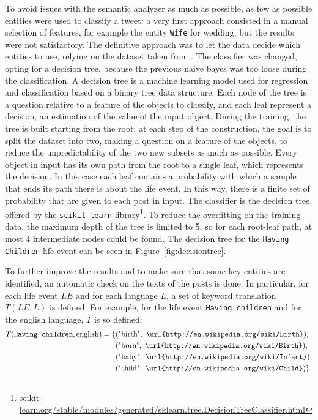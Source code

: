 To avoid issues with the semantic analyzer as much as possible, as few as possible entities were used to classify a tweet: a very first approach consisted in a manual selection of features, for example the entity \texttt{Wife} for wedding, but the results were not satisfactory. The definitive approach was to let the data decide which entities to use, relying on the dataset taken from \cite{dickinson2015identifying}. The classifier was changed, opting for a decision tree, because the previous naive bayes was too loose during the classification. A decision tree is a machine learning model used for regression and classification based on a binary tree data structure. Each node of the tree is a question relative to a feature of the objects to classify, and each leaf represent a decision, an estimation of the value of the input object. During the training, the tree is built starting from the root: at each step of the construction, the goal is to split the dataset into two, making a question on a feature of the objects, to reduce the unpredictability of the two new subsets as much as possible. Every object in input has its own path from the root to a single leaf, which represents the decision. In this case each leaf contains a probability with which a sample that ends its path there is about the life event. In this way, there is a finite set of probability that are given to each post in input. The classifier is the decision tree offered by the \texttt{scikit-learn} library\footnote{\url{scikit-learn.org/stable/modules/generated/sklearn.tree.DecisionTreeClassifier.html}}. To reduce the overfitting on the training data, the maximum depth of the tree is limited to 5, so for each root-leaf path, at most 4 intermediate nodes could be found. The decision tree for the \texttt{Having Children} life event can be seen in Figure~\ref{fig:decisiontree}.

To further improve the results and to make sure that some key entities are identified, an automatic check on the texts of the posts is done. In particular, for each life event $LE$ and for each language $L$, a set of keyword translation $T(LE, L)$ is defined. For example, for the life event \texttt{Having children} and for the english language, $T$ is so defined:
\begin{equation*}
\begin{split}
T(\text{\texttt{Having children}}, \text{english}) = \{&(\text{"birth"}, \text{ \texttt{\url{http://en.wikipedia.org/wiki/Birth}}}),\\&(\text{"born"}, \text{ \texttt{\url{http://en.wikipedia.org/wiki/Birth}}}),\\&(\text{"baby"}, \text{ \texttt{\url{http://en.wikipedia.org/wiki/Infant}}}),\\&(\text{"child"}, \text{ \texttt{\url{http://en.wikipedia.org/wiki/Child}}})\}
\end{split}
\end{equation*}

